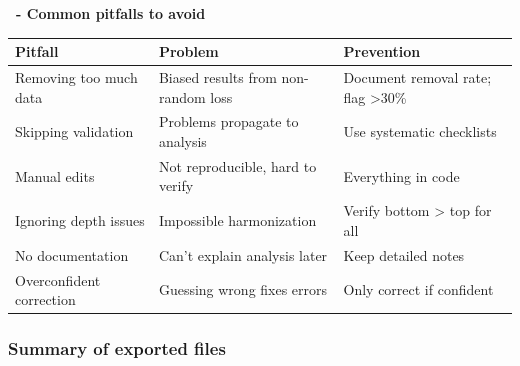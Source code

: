 \documentclass[
  10pt,
  b5paper,
  oneside]{book}
\begin{document}
\hfill\break

\textbf{~- Common pitfalls to avoid}

\begin{longtable}[]{@{}
  >{\raggedright\arraybackslash}p{}
  >{\raggedright\arraybackslash}p{}
  >{\raggedright\arraybackslash}p{}@{}}
\toprule\noalign{}
\begin{minipage}[b]{\linewidth}\raggedright
Pitfall
\end{minipage} & \begin{minipage}[b]{\linewidth}\raggedright
Problem
\end{minipage} & \begin{minipage}[b]{\linewidth}\raggedright
Prevention
\end{minipage} \\
\midrule\noalign{}
\endhead
\bottomrule\noalign{}
\endlastfoot
Removing too much data & Biased results from non-random loss & Document removal rate; flag \textgreater30\% \\
Skipping validation & Problems propagate to analysis & Use systematic checklists \\
Manual edits & Not reproducible, hard to verify & Everything in code \\
Ignoring depth issues & Impossible harmonization & Verify bottom \textgreater{} top for all \\
No documentation & Can't explain analysis later & Keep detailed notes \\
Overconfident correction & Guessing wrong fixes errors & Only correct if confident \\
\end{longtable}

\subsubsection{Summary of exported files}\label{summary-of-exported-files}
\end{document}
